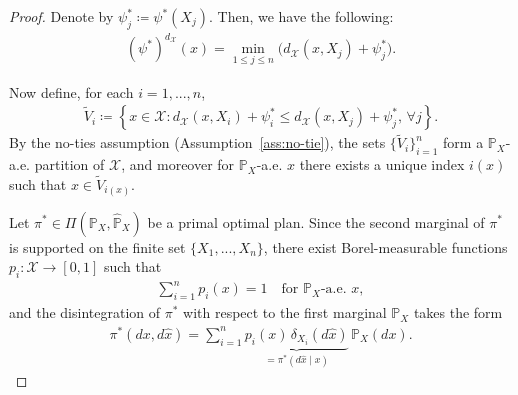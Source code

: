 \documentclass{article}
\theoremstyle{plain}
\theoremstyle{definition}
\theoremstyle{remark}
\begin{document}
\begin{proof}
	Denote by $\psi^{*}_j \coloneqq \psi^*(X_j)$. Then, we have the following:
	\begin{align*}
		(\psi^*)^{d_{\mathcal{X}}}(x) = \min_{1 \leq j \leq n} \bigl(d_{\mathcal{X}}(x,X_j) + \psi^*_j\bigr).		
	\end{align*}
	
	Now define, for each $i=1,...,n$,	
	\begin{align*}		
		\tilde{V}_i \coloneqq \left\{x \in \mathcal{X} : d_{\mathcal{X}}(x,X_i) + \psi^{*}_i \leq d_{\mathcal{X}}(x,X_j) + \psi^{*}_j , \, \forall j\right\}.	
	\end{align*}	
	By the no-ties assumption (Assumption~\ref{ass:no-tie}), the sets $\{\tilde{V}_i\}_{i=1}^n$ form a $\mathbb{P}_X$-a.e. partition of $\mathcal{X}$, and moreover for $\mathbb{P}_X$-a.e. $x$ there exists a unique index $i(x)$ such that $x \in \tilde{V}_{i(x)}$.
	
	Let $\pi^* \in \Pi(\mathbb{P}_X,\hat{\mathbb{P}}_X)$ be a primal optimal plan. Since the second marginal of $\pi^*$ is supported on the finite set $\{X_1,...,X_n\}$, there exist Borel-measurable functions $p_i : \mathcal{X} \to [0,1]$ such that	
	\begin{align*}		
		\sum_{i=1}^n p_i(x)=1 \quad \text{for }\mathbb{P}_X\text{-a.e. }x,		
	\end{align*}	
	and the disintegration of $\pi^*$ with respect to the first marginal $\mathbb{P}_X$ takes the form	
	\begin{align*}		
		\pi^*(dx,d\hat{x}) = \sum_{i=1}^n \underbrace{p_i(x) \, \delta_{X_i}(d\hat{x})}_{= \pi^*(d\hat{x} \mid x)} \, \mathbb{P}_X(dx) .		
	\end{align*}
	

\end{proof}
\end{document}

